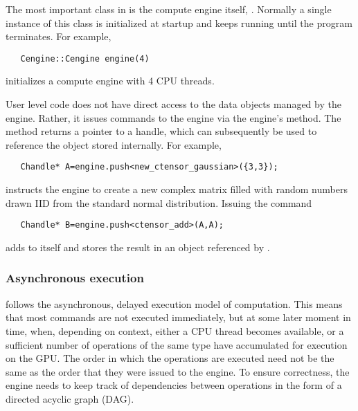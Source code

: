 \vspace{-10pt}
The most important class in \Cengine{} is the compute engine itself, . 
Normally a single instance of this class is initialized at startup and keeps running until 
the program terminates. For example, 

\texttt{~~~Cengine::Cengine engine(4)}

initializes a compute engine with 4 CPU threads. 

User level code does not have direct access to the data objects managed by the engine. 
Rather, it issues commands to the engine via the engine's  method. 
The  method returns a pointer to a handle, 
which can subsequently be used to reference the object stored internally. For example, 

\texttt{~~~Chandle* A=engine.push<new\_ctensor\_gaussian>(\{3,3\});}

instructs the engine to create a new  complex matrix filled with random numbers 
drawn IID from the standard normal distribution. Issuing the command 

\texttt{~~~Chandle* B=engine.push<ctensor\_add>(A,A);}

adds  to itself and stores the result in an object referenced by . 

\subsubsection*{Asynchronous execution}

\Cengine{} follows the asynchronous, delayed execution model of computation. This means that most  
commands are not executed immediately, but at some later moment in time, when,  
depending on context, either a CPU thread becomes available, or a sufficient number of operations 
of the same type have accumulated for execution on the GPU. 
The order in which the operations are executed need not be the same as the order that they 
were issued to the engine. 
To ensure correctness, the engine needs to keep track of dependencies between operations 
in the form of a directed acyclic graph (DAG). 
 

